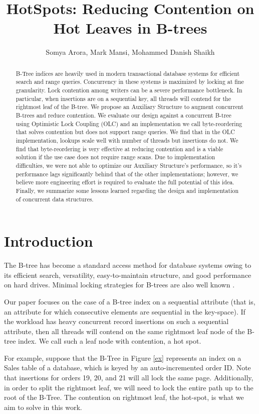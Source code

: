 \documentclass[twocolumn]{article}
\title{HotSpots: Reducing Contention on Hot Leaves in B-trees}
\date{}
\author{Somya Arora, Mark Mansi, Mohammed Danish Shaikh}
\begin{document}
\maketitle

\begin{abstract}
B-Tree indices are heavily used in modern transactional database systems for
efficient search and range queries. Concurrency in these systems is maximized
by locking at fine granularity. Lock contention among writers can be a severe
performance bottleneck. In particular, when insertions are on a sequential key,
all threads will contend for the rightmost leaf of the B-tree. We propose an
Auxiliary Structure to augment concurrent B-trees and reduce contention. We
evaluate our design against a concurrent B-tree using Optimistic Lock Coupling
(OLC) \cite{art} and an implementation we call byte-reordering that solves contention
but does not support range queries. We find that in the OLC implementation,
lookups scale well with number of threads but insertions do not. We find that
byte-reordering is very effective at reducing contention and is a viable
solution if the use case does not require range scans. Due to implementation
difficulties, we were not able to optimize our Auxiliary Structure’s
performance, so it’s performance lags significantly behind that of the other
implementations; however, we believe more engineering effort is required to
evaluate the full potential of this idea. Finally, we summarize some lessons
learned regarding the design and implementation of concurrent data structures.
\end{abstract}

\section{Introduction}
The B-tree has become a standard access method for database systems owing to
its efficient search, versatility, easy-to-maintain structure, and good
performance on hard drives. Minimal locking strategies for B-trees are also
well known \cite{blink}.

Our paper focuses on the case of a B-tree index on a sequential attribute (that
is, an attribute for which consecutive elements are sequential in the
key-space). If the workload has heavy concurrent record insertions on such a
sequential attribute, then all threads will contend on the same rightmost leaf
node of the B-tree index.  We call such a leaf node with contention, a hot
spot.

For example, suppose that the B-Tree in Figure \ref{ex} represents an index on a Sales
table of a database, which is keyed by an auto-incremented order ID. Note that
insertions for orders 19, 20, and 21 will all lock the same page. Additionally,
in order to split the rightmost leaf, we will need to lock the entire path up
to the root of the B-Tree. The contention on rightmost leaf, the hot-spot, is
what we aim to solve in this work.
\end{document}
